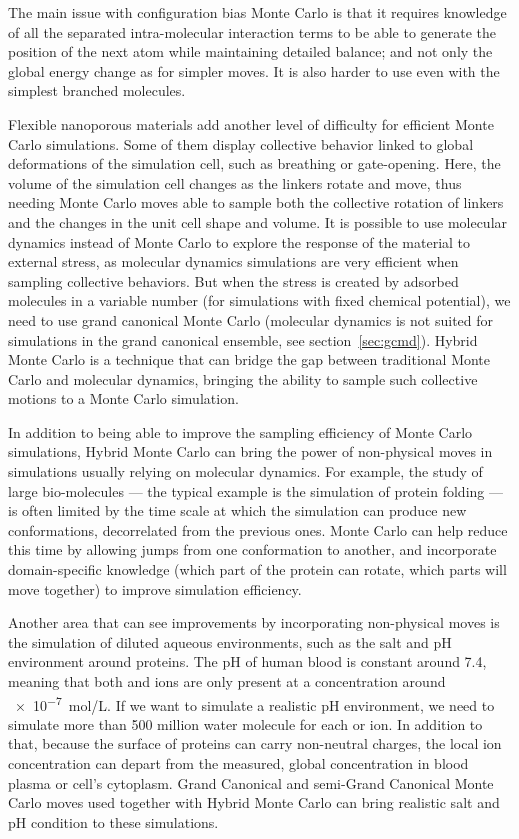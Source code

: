 \documentclass[thesis]{subfiles}
\begin{document}
The main issue with configuration bias Monte Carlo is that it requires
knowledge of all the separated intra-molecular interaction terms to be able to
generate the position of the next atom while maintaining detailed balance; and
not only the global energy change as for simpler moves. It is also harder to use
even with the simplest branched molecules.

Flexible nanoporous materials add another level of difficulty for efficient
Monte Carlo simulations. Some of them display collective behavior linked to
global deformations of the simulation cell, such as breathing or gate-opening.
Here, the volume of the simulation cell changes as the linkers rotate and move,
thus needing Monte Carlo moves able to sample both the collective rotation of
linkers and the changes in the unit cell shape and volume. It is possible to use
molecular dynamics instead of Monte Carlo to explore the response of the
material to external stress, as molecular dynamics simulations are very
efficient when sampling collective behaviors. But when the stress is created by
adsorbed molecules in a variable number (for simulations with fixed chemical
potential), we need to use grand canonical Monte Carlo (molecular dynamics is
not suited for simulations in the grand canonical ensemble, see
section~\ref{sec:gcmd}). Hybrid Monte Carlo is a technique that can bridge the
gap between traditional Monte Carlo and molecular dynamics, bringing the ability
to sample such collective motions to a Monte Carlo simulation\cite{Rogge2019}.

In addition to being able to improve the sampling efficiency of Monte Carlo
simulations, Hybrid Monte Carlo can bring the power of non-physical moves in
simulations usually relying on molecular dynamics. For example, the study of
large bio-molecules --- the typical example is the simulation of protein folding
--- is often limited by the time scale at which the simulation can produce new
conformations, decorrelated from the previous ones\cite{Izaguirre2004}. Monte
Carlo can help reduce this time by allowing jumps from one conformation to
another, and incorporate domain-specific knowledge (which part of the protein
can rotate, which parts will move together) to improve simulation efficiency.

Another area that can see improvements by incorporating non-physical moves is
the simulation of diluted aqueous environments, such as the salt and pH
environment around proteins. The pH of human blood is constant around 7.4,
meaning that both  and  ions are only present at a concentration
around \SI{e-7}{mol/L}. If we want to simulate a realistic pH environment, we
need to simulate more than 500 million water molecule for each  or
 ion. In addition to that, because the surface of proteins can carry
non-neutral charges, the local ion concentration can depart from the measured,
global concentration in blood plasma or cell's cytoplasm. Grand Canonical and
semi-Grand Canonical Monte Carlo moves used together with Hybrid Monte Carlo can
bring realistic salt and pH condition to these simulations\cite{Ross2018}.
\end{document}
